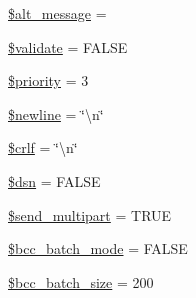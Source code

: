 \begin{DoxyCompactItemize}
\item 
\hyperlink{class_c_i___email_a266e7a7eb7cbcb0fc73a94b22a310a14}{\$alt\+\_\+message} = \textquotesingle{}\textquotesingle{}
\item 
\hyperlink{class_c_i___email_a320b75b46e1832c327d9d47b4cea9e7d}{\$validate} = F\+A\+L\+S\+E
\item 
\hyperlink{class_c_i___email_a2677e505e860db863720ac4e216fd3f2}{\$priority} = 3
\item 
\hyperlink{class_c_i___email_a8735d5c31c4af1004825e6a28f236aeb}{\$newline} = \char`\"{}\textbackslash{}n\char`\"{}
\item 
\hyperlink{class_c_i___email_a85554ab78e9a915b4299dd3f1d5c2866}{\$crlf} = \char`\"{}\textbackslash{}n\char`\"{}
\item 
\hyperlink{class_c_i___email_a6441cca8c9fa11e16d2017e8cb733c10}{\$dsn} = F\+A\+L\+S\+E
\item 
\hyperlink{class_c_i___email_ad646213e73754a396d49eacaa7fc8218}{\$send\+\_\+multipart} = T\+R\+U\+E
\item 
\hyperlink{class_c_i___email_ac67d3df67b03960980abe368f03e088e}{\$bcc\+\_\+batch\+\_\+mode} = F\+A\+L\+S\+E
\item 
\hyperlink{class_c_i___email_abdb56da29fb9feee14d2374170c3cb5c}{\$bcc\+\_\+batch\+\_\+size} = 200
\end{DoxyCompactItemize}
